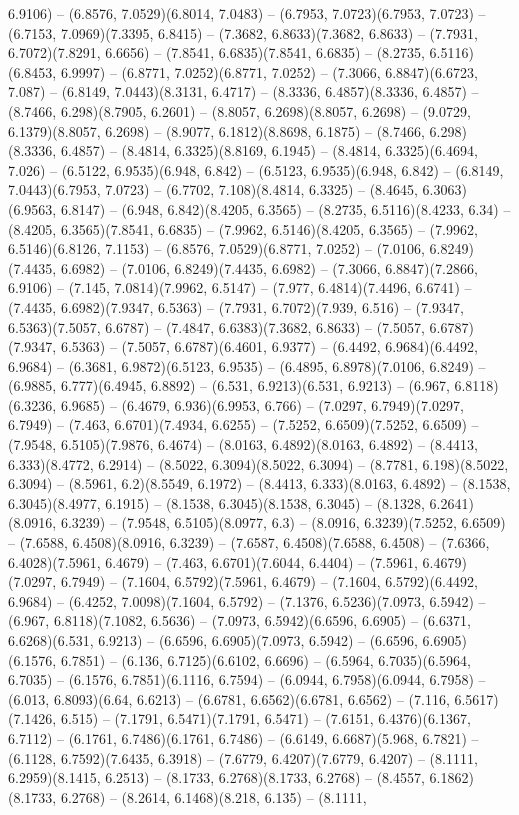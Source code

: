6.9106) -- (6.8576, 7.0529)(6.8014, 7.0483) -- (6.7953, 7.0723)(6.7953, 7.0723) -- (6.7153, 7.0969)(7.3395, 6.8415) -- (7.3682, 6.8633)(7.3682, 6.8633) -- (7.7931, 6.7072)(7.8291, 6.6656) -- (7.8541, 6.6835)(7.8541, 6.6835) -- (8.2735, 6.5116)(6.8453, 6.9997) -- (6.8771, 7.0252)(6.8771, 7.0252) -- (7.3066, 6.8847)(6.6723, 7.087) -- (6.8149, 7.0443)(8.3131, 6.4717) -- (8.3336, 6.4857)(8.3336, 6.4857) -- (8.7466, 6.298)(8.7905, 6.2601) -- (8.8057, 6.2698)(8.8057, 6.2698) -- (9.0729, 6.1379)(8.8057, 6.2698) -- (8.9077, 6.1812)(8.8698, 6.1875) -- (8.7466, 6.298)(8.3336, 6.4857) -- (8.4814, 6.3325)(8.8169, 6.1945) -- (8.4814, 6.3325)(6.4694, 7.026) -- (6.5122, 6.9535)(6.948, 6.842) -- (6.5123, 6.9535)(6.948, 6.842) -- (6.8149, 7.0443)(6.7953, 7.0723) -- (6.7702, 7.108)(8.4814, 6.3325) -- (8.4645, 6.3063)(6.9563, 6.8147) -- (6.948, 6.842)(8.4205, 6.3565) -- (8.2735, 6.5116)(8.4233, 6.34) -- (8.4205, 6.3565)(7.8541, 6.6835) -- (7.9962, 6.5146)(8.4205, 6.3565) -- (7.9962, 6.5146)(6.8126, 7.1153) -- (6.8576, 7.0529)(6.8771, 7.0252) -- (7.0106, 6.8249)(7.4435, 6.6982) -- (7.0106, 6.8249)(7.4435, 6.6982) -- (7.3066, 6.8847)(7.2866, 6.9106) -- (7.145, 7.0814)(7.9962, 6.5147) -- (7.977, 6.4814)(7.4496, 6.6741) -- (7.4435, 6.6982)(7.9347, 6.5363) -- (7.7931, 6.7072)(7.939, 6.516) -- (7.9347, 6.5363)(7.5057, 6.6787) -- (7.4847, 6.6383)(7.3682, 6.8633) -- (7.5057, 6.6787)(7.9347, 6.5363) -- (7.5057, 6.6787)(6.4601, 6.9377) -- (6.4492, 6.9684)(6.4492, 6.9684) -- (6.3681, 6.9872)(6.5123, 6.9535) -- (6.4895, 6.8978)(7.0106, 6.8249) -- (6.9885, 6.777)(6.4945, 6.8892) -- (6.531, 6.9213)(6.531, 6.9213) -- (6.967, 6.8118)(6.3236, 6.9685) -- (6.4679, 6.936)(6.9953, 6.766) -- (7.0297, 6.7949)(7.0297, 6.7949) -- (7.463, 6.6701)(7.4934, 6.6255) -- (7.5252, 6.6509)(7.5252, 6.6509) -- (7.9548, 6.5105)(7.9876, 6.4674) -- (8.0163, 6.4892)(8.0163, 6.4892) -- (8.4413, 6.333)(8.4772, 6.2914) -- (8.5022, 6.3094)(8.5022, 6.3094) -- (8.7781, 6.198)(8.5022, 6.3094) -- (8.5961, 6.2)(8.5549, 6.1972) -- (8.4413, 6.333)(8.0163, 6.4892) -- (8.1538, 6.3045)(8.4977, 6.1915) -- (8.1538, 6.3045)(8.1538, 6.3045) -- (8.1328, 6.2641)(8.0916, 6.3239) -- (7.9548, 6.5105)(8.0977, 6.3) -- (8.0916, 6.3239)(7.5252, 6.6509) -- (7.6588, 6.4508)(8.0916, 6.3239) -- (7.6587, 6.4508)(7.6588, 6.4508) -- (7.6366, 6.4028)(7.5961, 6.4679) -- (7.463, 6.6701)(7.6044, 6.4404) -- (7.5961, 6.4679)(7.0297, 6.7949) -- (7.1604, 6.5792)(7.5961, 6.4679) -- (7.1604, 6.5792)(6.4492, 6.9684) -- (6.4252, 7.0098)(7.1604, 6.5792) -- (7.1376, 6.5236)(7.0973, 6.5942) -- (6.967, 6.8118)(7.1082, 6.5636) -- (7.0973, 6.5942)(6.6596, 6.6905) -- (6.6371, 6.6268)(6.531, 6.9213) -- (6.6596, 6.6905)(7.0973, 6.5942) -- (6.6596, 6.6905)(6.1576, 6.7851) -- (6.136, 6.7125)(6.6102, 6.6696) -- (6.5964, 6.7035)(6.5964, 6.7035) -- (6.1576, 6.7851)(6.1116, 6.7594) -- (6.0944, 6.7958)(6.0944, 6.7958) -- (6.013, 6.8093)(6.64, 6.6213) -- (6.6781, 6.6562)(6.6781, 6.6562) -- (7.116, 6.5617)(7.1426, 6.515) -- (7.1791, 6.5471)(7.1791, 6.5471) -- (7.6151, 6.4376)(6.1367, 6.7112) -- (6.1761, 6.7486)(6.1761, 6.7486) -- (6.6149, 6.6687)(5.968, 6.7821) -- (6.1128, 6.7592)(7.6435, 6.3918) -- (7.6779, 6.4207)(7.6779, 6.4207) -- (8.1111, 6.2959)(8.1415, 6.2513) -- (8.1733, 6.2768)(8.1733, 6.2768) -- (8.4557, 6.1862)(8.1733, 6.2768) -- (8.2614, 6.1468)(8.218, 6.135) -- (8.1111, 